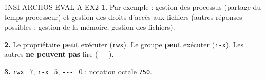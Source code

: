 \begin{corrige}{1NSI-ARCHOS-EVAL-A-EX2}
\textbf{1.} Par exemple : gestion des processus (partage du temps processeur) et gestion
des droits d'accès aux fichiers (autres réponses possibles : gestion de la mémoire,
gestion des fichiers).

\textbf{2.} Le propriétaire \textbf{peut} exécuter (\lstinline{rwx}). Le groupe
\textbf{peut} exécuter (\lstinline{r-x}). Les autres \textbf{ne peuvent pas} lire
(\lstinline{---}).

\textbf{3.} \lstinline{rwx}=$7$, \lstinline{r-x}=$5$, \lstinline{---}=$0$ : notation
octale \lstinline{750}.
\end{corrige}
